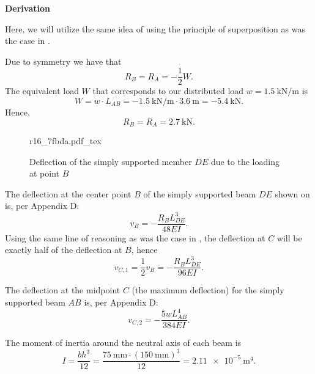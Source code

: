\documentclass[a4paper]{article}
\newcommand{\incfig}[2][1]{%
  \def\svgwidth{#1\columnwidth}
  {#2.pdf_tex}
}
\numberwithin{equation}{problem}
\newcommand{\AUheading}[1]{%
  \par\vspace{.4\baselineskip}%
  {\sffamily\bfseries\color{AUblueDark}#1\par}%
  \nobreak%
}
\newenvironment{derivation}[1][Derivation]{%
  \AUheading{#1}
  \begingroup\allowdisplaybreaks
  \setlength{\abovedisplayskip}{6pt}%
  \setlength{\belowdisplayskip}{6pt}%
  \setlength{\abovedisplayshortskip}{4pt}%
  \setlength{\belowdisplayshortskip}{4pt}%
}{\par\endgroup\medskip}
\begin{document}
\begin{derivation}
  Here, we will utilize the same idea of using the principle of superposition as was the case in .

  Due to symmetry we have that
  \begin{equation*}
    R_B = R_A = - \frac{1}{2} W
  .\end{equation*}
  The equivalent load $W$ that corresponds to our distributed load $w = \qty{1,5}{\kN\per\m}$ is
  \begin{equation*}
    W = w \cdot L_{AB} = \qty{-1,5}{\kN\per\m} \cdot \qty{3,6}{\m} = \qty{-5,4}{\kN} 
  .\end{equation*}
  Hence,
  \begin{equation*}
    R_B = R_A = \qty{2,7}{\kN}
  .\end{equation*}
  
\begin{figure}[ht]
    \centering
    \incfig{r16_7fbda}
    \caption{Deflection of the simply supported member $DE$ due to the loading at point $B$}
    \label{fig:r16_7fbda}
\end{figure}

  The deflection at the center point $B$ of the simply supported beam $DE$ shown on  is, per Appendix D:
  \begin{equation*}
    v_{B} = - \frac{R_BL_{DE}^3}{48 EI}
  .\end{equation*}
  Using the same line of reasoning as was the case in , the deflection at $C$ will be exactly half of the deflection at $B$, hence
  \begin{equation*}
    v_{C,1} = \frac{1}{2} v_B = - \frac{R_B L_{DE}^3}{96 EI}
  .\end{equation*}
  
  The deflection at the midpoint $C$ (the maximum deflection) for the simply supported beam $AB$ is, per Appendix D:
  \begin{equation*}
    v_{C,2} = - \frac{5 w L_{AB}^{4}}{384 EI}
  .\end{equation*}

  The moment of inertia around the neutral axis of each beam is
  \begin{equation*}
    I = \frac{b h^3}{12} = \frac{\qty{75}{\mm} \cdot \left( \qty{150}{\mm}  \right)^3}{12} = \qty{2,11e-5}{\m^{4}} 
  .\end{equation*}
  

\end{derivation}
\end{document}
